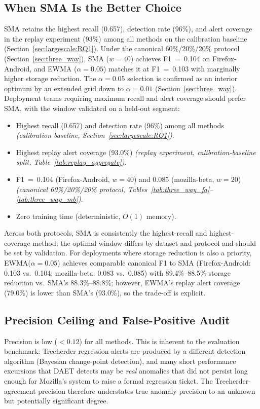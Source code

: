 \documentclass[a4paper,fleqn]{cas-sc}
\theoremstyle{plain}
\begin{document}
\subsection{When SMA Is the Better Choice}

SMA retains the highest recall (0.657), detection rate (96\%), and alert
coverage in the replay experiment (93\%) among all methods on the
calibration baseline (Section~\ref{sec:largescale:RQ1}).
Under the canonical 60\%/20\%/20\% protocol (Section~\ref{sec:three_way}),
SMA ($w=40$) achieves F1~=~0.104 on Firefox-Android, and EWMA ($\alpha=0.05$)
matches it at F1~=~0.103 with marginally higher storage reduction.
The $\alpha=0.05$ selection is confirmed as an interior optimum by an extended
grid down to $\alpha=0.01$ (Section~\ref{sec:three_way}).
Deployment teams requiring maximum recall and alert coverage should prefer
SMA, with the window validated on a held-out segment:
\begin{itemize}
  \item Highest recall (0.657) and detection rate (96\%) among all methods
    \textit{(calibration baseline, Section~\ref{sec:largescale:RQ1})}.
  \item Highest replay alert coverage (93.0\%)
    \textit{(replay experiment, calibration-baseline split,
    Table~\ref{tab:replay_aggregate})}.
  \item F1~=~0.104 (Firefox-Android, $w=40$) and 0.085 (mozilla-beta, $w=20$)
    \textit{(canonical 60\%/20\%/20\% protocol,
    Tables~\ref{tab:three_way_fa}--\ref{tab:three_way_mb})}.
  \item Zero training time (deterministic, $O(1)$ memory).
\end{itemize}
Across both protocols, SMA is consistently the highest-recall and
highest-coverage method; the optimal window differs by dataset and protocol
and should be set by validation.
For deployments where storage reduction is also a priority,
EWMA($\alpha=0.05$) achieves comparable canonical F1 to SMA
(Firefox-Android: 0.103 vs.\ 0.104; mozilla-beta: 0.083 vs.\ 0.085)
with 89.4\%--88.5\% storage reduction vs.\ SMA's 88.3\%--88.8\%;
however, EWMA's replay alert coverage (79.0\%) is lower than SMA's (93.0\%),
so the trade-off is explicit.

\subsection{Precision Ceiling and False-Positive Audit}\label{sec:discussion:fp}

Precision is low ($<0.12$) for all methods.
This is inherent to the evaluation benchmark: Treeherder regression alerts
are produced by a different detection algorithm (Bayesian change-point
detection), and many short performance excursions that DAET detects may
be \emph{real} anomalies that did not persist long enough for Mozilla's
system to raise a formal regression ticket.
The Treeherder-agreement precision therefore understates true anomaly
precision to an unknown but potentially significant degree.
\end{document}
